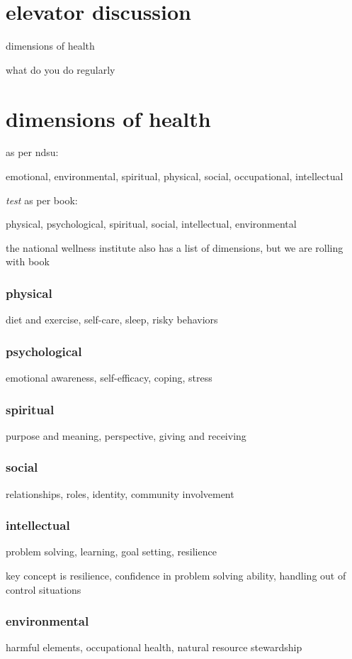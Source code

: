 \documentclass[letterpaper]{article}
\begin{document}
\section*{elevator discussion}
dimensions of health

what do you do regularly

\section*{dimensions of health}
as per ndsu:

emotional, environmental, spiritual, physical, social, occupational, intellectual

\emph{test}
as per book:

physical, psychological, spiritual, social, intellectual, environmental

the national wellness institute also has a list of dimensions, but we are rolling with book

\subsubsection*{physical}
diet and exercise, self-care, sleep, risky behaviors
\subsubsection*{psychological}
emotional awareness, self-efficacy, coping, stress
\subsubsection*{spiritual}
purpose and meaning, perspective, giving and receiving
\subsubsection*{social}
relationships, roles, identity, community involvement
\subsubsection*{intellectual}
problem solving, learning, goal setting, resilience

key concept is resilience, confidence in problem solving ability, handling out of control situations
\subsubsection*{environmental}
harmful elements, occupational health, natural resource stewardship
\end{document}
